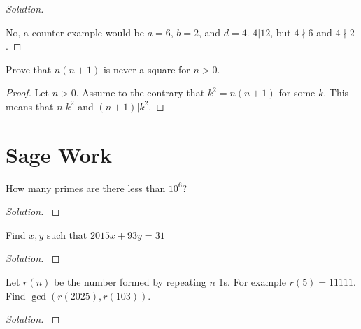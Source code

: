 \documentclass[11pt]{article}
\newenvironment{problem}[2][Problem]{\begin{trivlist}
\item[\hskip \labelsep {\bfseries #1}\hskip \labelsep {\bfseries #2.}]}{\end{trivlist}}
\newenvironment{solution}
  {\renewcommand\qedsymbol{$~$}\begin{proof}[Solution]$ $\par\nobreak\ignorespaces}
  {\end{proof}}
\begin{document}
\begin{solution}
  No, a counter example would be $a=6$, $b=2$, and $d=4$. $4|12$, but $4\nmid 6$ and $4\nmid 2$.
\end{solution}



\begin{problem}{10}
Prove that $n(n+1)$ is never a square for $n>0$.
\end{problem}

\begin{proof}
  Let $n>0$. Assume to the contrary that $k^2=n(n+1)$ for some $k$. This means that $n|k^2$ and $(n+1)|k^2$.

\end{proof}




\section{Sage Work}


\begin{problem}{A}
How many primes are there less than $10^6$?
\end{problem}

\begin{solution}
  

  
\end{solution}



\begin{problem}{B}
Find $x,y$ such that $2015x+93y=31$
\end{problem}

\begin{solution}
  

  
\end{solution}


\begin{problem}{C (Extra Credit)}
Let $r(n)$ be the number formed by repeating $n$ 1s. For example $r(5)=11111$. Find $\gcd(r(2025),r(103))$.

\end{problem}

\begin{solution}
  

  
\end{solution}
\end{document}
